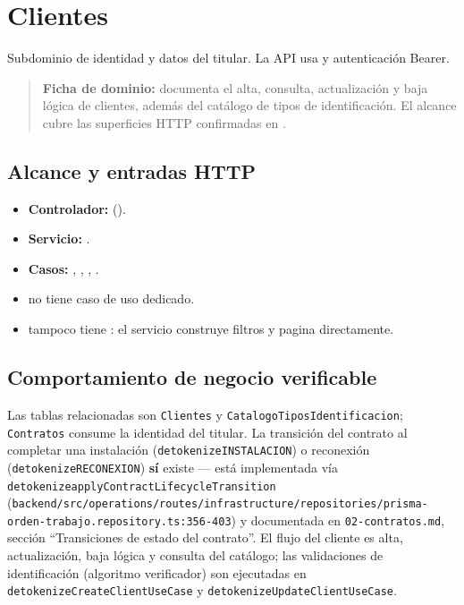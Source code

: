 \section{Clientes}


Subdominio de identidad y datos del titular. La API usa \texttt{} y autenticación Bearer.


\begin{quote}
\textbf{Ficha de dominio:} documenta el alta, consulta, actualización y baja lógica de clientes, además del catálogo de tipos de identificación. El alcance cubre las superficies HTTP confirmadas en \texttt{}.
\end{quote}


\subsection{Alcance y entradas HTTP}


\begin{itemize}
\item \textbf{Controlador:} \texttt{} (\texttt{}).
\item \textbf{Servicio:} \texttt{}.
\item \textbf{Casos:} \texttt{}, \texttt{}, \texttt{}, \texttt{}.
\item \texttt{} no tiene caso de uso dedicado.
\item \texttt{} tampoco tiene \texttt{}: el servicio construye filtros y pagina directamente.
\end{itemize}

\subsection{Comportamiento de negocio verificable}
Las tablas relacionadas son \texttt{Clientes} y \texttt{CatalogoTiposIdentificacion}; \texttt{Contratos} consume la identidad del titular. La transición del contrato al completar una instalación (\texttt{detokenize{INSTALACION}}) o reconexión (\texttt{detokenize{RECONEXION}}) \textbf{sí} existe --- está implementada vía \texttt{detokenize{applyContractLifecycleTransition}} (\texttt{backend/src/operations/routes/infrastructure/repositories/prisma-orden-trabajo.repository.ts:356-403}) y documentada en \texttt{02-contratos.md}, sección ``Transiciones de estado del contrato''. El flujo del cliente es alta, actualización, baja lógica y consulta del catálogo; las validaciones de identificación (algoritmo verificador) son ejecutadas en \texttt{detokenize{CreateClientUseCase}} y \texttt{detokenize{UpdateClientUseCase}}.


